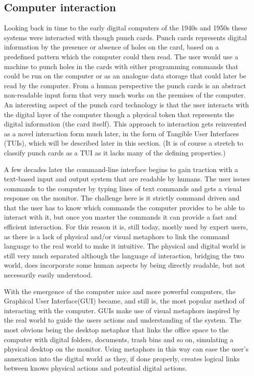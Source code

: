\subsection{Computer interaction}
Looking back in time to the early digital computers of the 1940s and 1950s these systems were interacted with though punch cards.
Punch cards represents digital information by the presence or absence of holes on the card, based on a predefined pattern which the computer could then read.
The user would use a machine to punch holes in the cards with either programming commands that could be run on the computer or as an analogue data storage that could later be read by the computer.
From a human perspective the punch cards is an abstract non-readable input form that very much works on the premises of the computer.
An interesting aspect of the punch card technology is that the user interacts with the digital layer of the computer though a physical token that represents the digital information (the card itself).
This approach to interaction gets reinvented as a novel interaction form much later, in the form of Tangible User Interfaces (TUIs), which will be described later in this section.
(It is of course a stretch to classify punch cards as a TUI as it lacks many of the defining properties.) 

A few decades later the command-line interface begins to gain traction with a text-based input and output system that are readable by humans.
The user issues commands to the computer by typing lines of text commands and gets a visual response on the monitor.
The challenge here is it strictly command driven and that the user has to know which commands the computer provides to be able to interact with it, but once you master the commands it can provide a fast and efficient interaction.
For this reason it is, still today, mostly used by expert users, as there is a lack of physical and/or visual metaphors to link the command language to the real world to make it intuitive.  
The physical and digital world is still very much separated although the language of interaction, bridging the two world, does incorporate some human aspects by being directly readable, but not necessarily easily understood.

With the emergence of the computer mice and more powerful computers, the Graphical User Interface(GUI) became, and still is, the most popular method of interacting with the computer.
GUIs make use of visual metaphors inspired by the real world to guide the users actions and understanding of the system.
The most obvious being the desktop metaphor that links the office space to the computer with digital folders, documents, trash bins and so on, simulating a physical desktop on the monitor.
Using metaphors in this way can ease the user's annexation into the digital world as they, if done properly, creates logical links between knows physical actions and potential digital actions.

